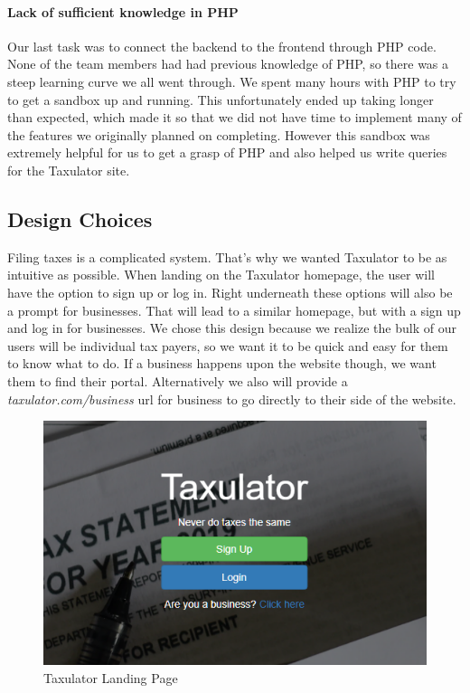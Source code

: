 \documentclass[sigconf]{acmart}
\begin{document}
\paragraph{Lack of sufficient knowledge in PHP}
Our last task was to connect the backend to the frontend through PHP code. None of the team members had had previous knowledge of PHP, so there was a steep learning curve we all went through. We spent many hours with PHP to try to get a sandbox up and running. This unfortunately ended up taking longer than expected, which made it so that we did not have time to implement many of the features we originally planned on completing. However this sandbox \cite{Sandbox} was extremely helpful for us to get a grasp of PHP and also helped us write queries for the Taxulator site.

\subsection{Design Choices}
Filing taxes is a complicated system. That's why we wanted Taxulator to be as intuitive as possible. When landing on the Taxulator homepage, the user will have the option to sign up or log in. Right underneath these options will also be a prompt for businesses. That will lead to a similar homepage, but with a sign up and log in for businesses. We chose this design because we realize the bulk of our users will be individual tax payers, so we want it to be quick and easy for them to know what to do. If a business happens upon the website though, we want them to find their portal. Alternatively we also will provide a \textit{taxulator.com/business} url for business to go directly to their side of the website.

\begin{figure}[H]
 \label{Home}
  \centering
  \includegraphics[width=\linewidth]{Images/TaxulatorHome2.png}
  \caption{Taxulator Landing Page}
\end{figure}
\end{document}
